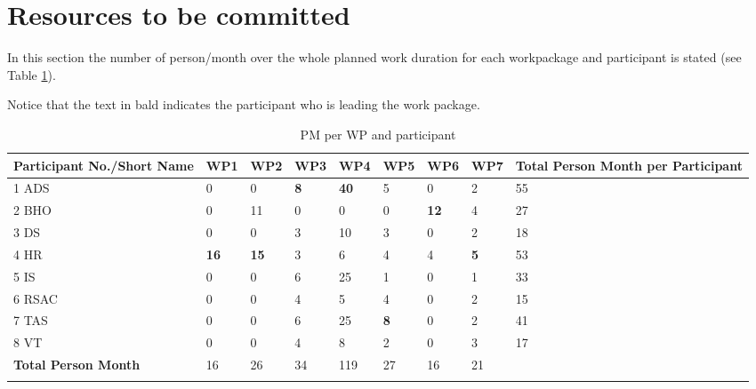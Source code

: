 \section{Resources to be committed}

In this section the number of person/month over the whole planned work duration for each workpackage and participant is stated (see Table \ref{PMWP}).

Notice that the text in bald indicates the participant who is leading the work package.

\begin{longtable}[H]{p{1.9cm} p{1cm} p{1cm} p{1cm} p{1cm} p{1cm} p{1cm} p{1cm} | p{2.3cm}}
	\toprule[2pt]
	
	\textbf{Participant No./Short Name} & \textbf{WP1} & \textbf{WP2} & \textbf{WP3} & \textbf{WP4} & \textbf{WP5} & \textbf{WP6} & \textbf{WP7} & \textbf{Total Person Month per Participant} \\
	
	\midrule[1.5pt] 
	\endhead
	
	 1 ADS & 0 & 0 & \textbf{8} & \textbf{40} & 5 & 0 & 2 &  55 \vspace{0.2cm} \\
	
	\midrule

	 2 BHO & 0 & 11 & 0 & 0 & 0 & \textbf{12} & 4 & 27 \vspace{0.2cm} \\
	
	\midrule
	
	 3 DS & 0 & 0 & 3 & 10 & 3 & 0 & 2 & 18 \vspace{0.2cm} \\

	\midrule

 	 4 HR & \textbf{16} & \textbf{15} & 3 & 6 & 4 & 4 & \textbf{5} & 53 \vspace{0.2cm} \\
 	 
 	 \midrule
 	 
 	 5 IS & 0 & 0 & 6 & 25 & 1 & 0 & 1 & 33 \vspace{0.2cm} \\
 	 
 	 \midrule
 	 
 	 6 RSAC & 0 & 0 & 4 & 5 & 4 & 0 & 2 & 15 \vspace{0.2cm} \\
 	 
 	 \midrule
 	 
 	 7 TAS & 0 & 0 & 6 & 25 & \textbf{8} & 0 & 2 & 41\vspace{0.2cm} \\

 	 \midrule
 	 
 	 8 VT & 0 & 0 & 4 & 8 & 2 & 0 & 3 & 17 \vspace{0.2cm} \\
 	 
 	 \midrule[1.5pt]
 	 
 	 \textbf{Total Person Month} & 16 & 26 & 34 & 119 & 27 & 16 & 21 & \vspace{0.2cm} \\
	
	\bottomrule[2pt]
	
	\caption{PM per WP and participant}
	\label{PMWP}
\end{longtable}